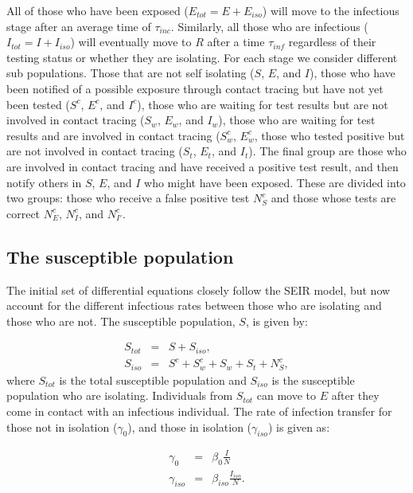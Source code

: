 \documentclass[notitlepage, superscriptaddress]{revtex4-2}
\begin{document}
All of those who have been exposed ($E_{tot} = E + E_{iso}$) will move to the infectious stage after an average time of $\tau_{inc}$. Similarly, all those who are infectious ($I_{tot} =  I + I_{iso}$) will eventually move to $R$ after a time $\tau_{inf}$ regardless of their testing status or whether they are isolating. For each stage we consider different sub populations. Those that are not self isolating ($S$, $E$, and $I$), those who have been notified of a possible exposure through contact tracing but have not yet been tested ($S^{c}$, $E^{c}$, and $I^{c}$), those who are waiting for test results but are not involved in contact tracing ($S_{w}$, $E_{w}$, and $I_{w}$), those who are waiting for test results and are involved in contact tracing ($S^{c}_{w}$, $E^{c}_{w}$, those who tested positive but are not involved in contact tracing ($S_{t}$, $E_{t}$, and $I_{t}$). The final group are those who are involved in contact tracing and have received a positive test result, and then notify others in $S$, $E$, and $I$ who might have been exposed. These are divided into two groups: those who receive a false positive test $N^{c}_{S}$ and those whose tests are correct $N^{c}_{E}$, $N^{c}_{I}$, and $N^{c}_{I'}$.

\subsection{The susceptible population}

The initial set of differential equations closely follow the SEIR model, but now account for the different infectious rates between those who are isolating and those who are not. The susceptible population, $S$, is given by:

\begin{eqnarray}
\label{E:Stot}
S_{tot} &=& S + S_{iso}, \\
% 
S_{iso} &=& S^{c} + S^{c}_{w} + S_{w} + S_{t} + N^{c}_{S},
\end{eqnarray}
where $S_{tot}$ is the total susceptible population and $S_{iso}$ is the susceptible population who are isolating. Individuals from $S_{tot}$ can move to $E$ after they come in contact with an infectious individual. The rate of infection transfer for those not in isolation ($\gamma_{0}$), and those in isolation ($\gamma_{iso}$) is given as:

\begin{eqnarray}
\label{E:infectionrates}
\gamma_{0} &=& \beta_0 \frac{I}{N} \\
% 
\gamma_{iso} &=& \beta_{iso} \frac{I_{iso}}{N}.
\end{eqnarray}
\end{document}
